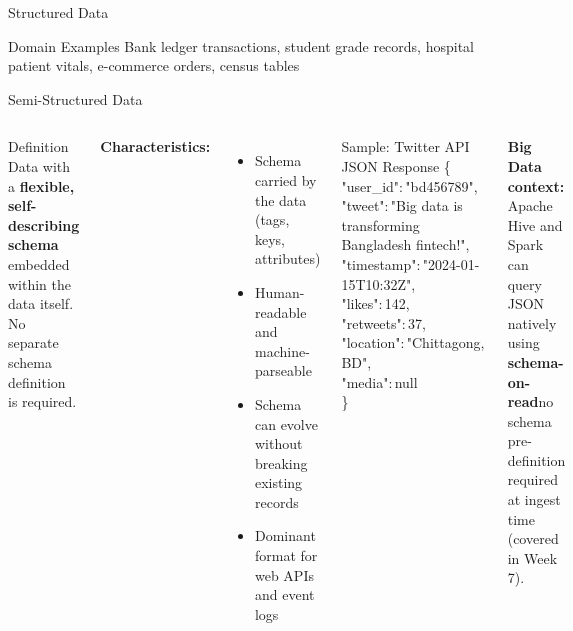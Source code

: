 \documentclass[aspectratio=169,10pt]{beamer}
\begin{document}
\begin{frame}{Structured Data}
  
      \vspace{4pt}
      \begin{exampleblock}{Domain Examples}
        Bank ledger transactions, student grade records, hospital patient vitals, e-commerce orders, census tables
      \end{exampleblock}
\end{frame}

\begin{frame}{Semi-Structured Data}
  \begin{columns}[T]
      \begin{block}{Definition}
        Data with a \textbf{flexible, self-describing schema} embedded within the data itself.  No separate schema definition is required.
      \end{block}
      \vspace{4pt}
      \textbf{Characteristics:}
      \begin{itemize}
        \item Schema carried by the data (tags, keys, attributes)
        \item Human-readable and machine-parseable
        \item Schema can evolve without breaking existing records
        \item Dominant format for web APIs and event logs
      \end{itemize}
   
   

      \begin{block}{Sample: Twitter API JSON Response}
        \scriptsize\ttfamily
        \{\\
        \quad "user\_id":\,"bd456789",\\
        \quad "tweet":\,"Big data is transforming\\
        \quad \quad Bangladesh fintech!",\\
        \quad "timestamp":\,"2024-01-15T10:32Z",\\
        \quad "likes":\,142,\\
        \quad "retweets":\,37,\\
        \quad "location":\,"Chittagong,\,BD",\\
        \quad "media":\,null\\
        \}
      \end{block}
      \vspace{4pt}
      \small \textbf{Big Data context:}  Apache Hive and Spark can query JSON natively using \textbf{schema-on-read}\textemdash no schema pre-definition required at ingest time (covered in Week 7).
  \end{columns}
\end{frame}
\end{document}
